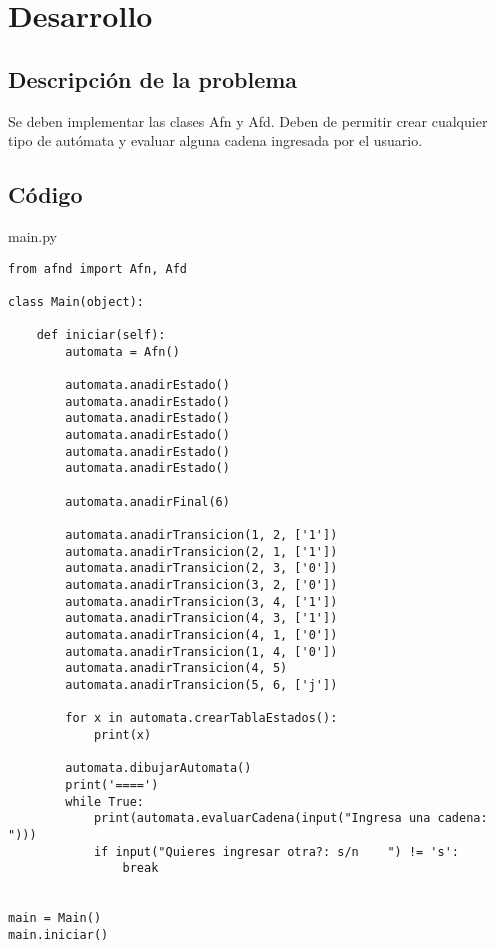 \section{Desarrollo}

\subsection{Descripción de la problema}

Se deben implementar las clases Afn y Afd. Deben de permitir crear cualquier tipo de autómata y evaluar alguna cadena ingresada por el usuario.

\subsection{Código}

main.py
\lstset{language=Python, breaklines=true, basicstyle=\footnotesize}
\begin{lstlisting}[frame=single]
from afnd import Afn, Afd

class Main(object):

    def iniciar(self):
        automata = Afn()

        automata.anadirEstado()
        automata.anadirEstado()
        automata.anadirEstado()
        automata.anadirEstado()
        automata.anadirEstado()
        automata.anadirEstado()

        automata.anadirFinal(6)

        automata.anadirTransicion(1, 2, ['1'])
        automata.anadirTransicion(2, 1, ['1'])
        automata.anadirTransicion(2, 3, ['0'])
        automata.anadirTransicion(3, 2, ['0'])
        automata.anadirTransicion(3, 4, ['1'])
        automata.anadirTransicion(4, 3, ['1'])
        automata.anadirTransicion(4, 1, ['0'])
        automata.anadirTransicion(1, 4, ['0'])
        automata.anadirTransicion(4, 5)
        automata.anadirTransicion(5, 6, ['j'])

        for x in automata.crearTablaEstados():
            print(x)

        automata.dibujarAutomata()
        print('====')
        while True:
            print(automata.evaluarCadena(input("Ingresa una cadena: ")))
            if input("Quieres ingresar otra?: s/n    ") != 's':
                break


main = Main()
main.iniciar()
\end{lstlisting}


